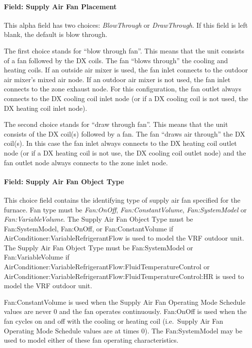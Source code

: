 \paragraph{Field: Supply Air Fan Placement}\label{field-supply-air-fan-placement-000}

This alpha field has two choices: \textit{BlowThrough} or \textit{DrawThrough}. If this field is left blank, the default is blow through.

The first choice stands for ``blow through fan''. This means that the unit consists of a fan followed by the DX coils. The fan ``blows through'' the cooling and heating coils. If an outside air mixer is used, the fan inlet connects to the outdoor air mixer's mixed air node. If an outdoor air mixer is not used, the fan inlet connects to the zone exhaust node. For this configuration, the fan outlet always connects to the DX cooling coil inlet node (or if a DX cooling coil is not used, the DX heating coil inlet node).

The second choice stands for ``draw through fan''. This means that the unit consists of the DX coil(s) followed by a fan. The fan ``draws air through'' the DX coil(s). In this case the fan inlet always connects to the DX heating coil outlet node (or if a DX heating coil is not use, the DX cooling coil outlet node) and the fan outlet node always connects to the zone inlet node.

\paragraph{Field: Supply Air Fan Object Type}\label{field-supply-air-fan-object-type-8}

This choice field contains the identifying type of supply air fan specified for the furnace. Fan type must be \textit{Fan:OnOff}, \textit{Fan:ConstantVolume}, \textit{Fan:SystemModel} or \textit{Fan:VariableVolume}. The Supply Air Fan Object Type must be Fan:SystemModel, Fan:OnOff, or Fan:ConstantVolume if AirConditioner:VariableRefrigerantFlow is used to model the VRF outdoor unit. The Supply Air Fan Object Type must be Fan:SystemModel or Fan:VariableVolume if AirConditioner:VariableRefrigerantFlow:\-FluidTemperatureControl or AirConditioner:VariableRefrigerantFlow:\-FluidTemperatureControl:HR is used to model the VRF outdoor unit.

Fan:ConstantVolume is used when the Supply Air Fan Operating Mode Schedule values are never 0 and the fan operates continuously. Fan:OnOff is used when the fan cycles on and off with the cooling or heating coil (i.e.~Supply Air Fan Operating Mode Schedule values are at times 0). The Fan:SystemModel may be used to model either of these fan operating characteristics.

